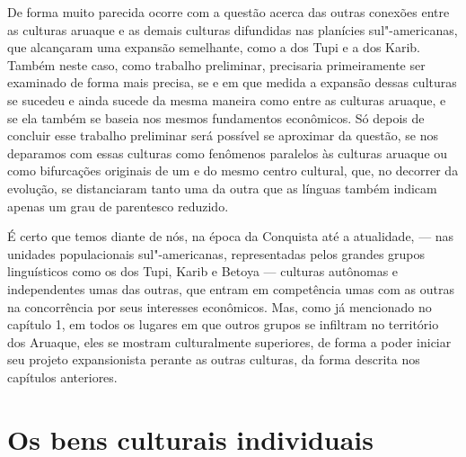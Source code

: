 De forma muito parecida ocorre com a questão acerca das outras conexões
entre as culturas aruaque e as demais culturas difundidas nas planícies
sul"-americanas, que alcançaram uma expansão semelhante, como a dos Tupi
e a dos Karib. Também neste caso, como trabalho preliminar, precisaria
primeiramente ser examinado de forma mais precisa, se e em que medida a
expansão dessas culturas se sucedeu e ainda sucede da mesma maneira
como entre as culturas aruaque, e se ela também se baseia nos mesmos
fundamentos econômicos. Só depois de concluir esse trabalho preliminar
será possível se aproximar da questão, se nos deparamos com essas
culturas como fenômenos paralelos às culturas aruaque ou como
bifurcações originais de um e do mesmo centro cultural, que, no decorrer
da evolução, se distanciaram tanto uma da outra que as línguas também
indicam apenas um grau de parentesco reduzido.

É certo que temos diante de nós, na época da Conquista até a atualidade,
--- nas unidades populacionais sul"-americanas, representadas pelos
grandes grupos linguísticos como os dos Tupi, Karib e Betoya --- culturas
autônomas e independentes umas das outras, que entram em competência
umas com as outras na concorrência por seus interesses econômicos. Mas,
como já mencionado no capítulo 1, em todos os lugares em que outros
grupos se infiltram no território dos Aruaque, eles se mostram
culturalmente superiores, de forma a poder iniciar seu projeto
expansionista perante as outras culturas, da forma descrita nos
capítulos anteriores.

\chapter*{Os bens culturais individuais\smallskip{}}


